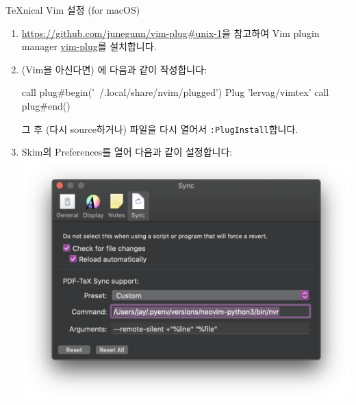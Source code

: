 \documentclass{beamer}
\begin{document}
\begin{frame}{\TeX{}nical Vim 설정 (for macOS)}
\begin{enumerate}
    \framebreak
    \item \url{https://github.com/junegunn/vim-plug#unix-1}을 참고하여 Vim plugin manager \href{https://github.com/junegunn/vim-plug}{vim-plug}를 설치합니다.
    \item (Vim을 아신다면) 에 다음과 같이 작성합니다:
      \begin{vimcode}
        call plug#begin('~/.local/share/nvim/plugged')
        Plug 'lervag/vimtex'
        call plug#end()
      \end{vimcode}
      그 후 (다시 source하거나) 파일을 다시 열어서 \verb/:PlugInstall/합니다.

    \framebreak
    \item Skim의 Preferences를 열어 다음과 같이 설정합니다:
      \centering\includegraphics[width=0.9\linewidth]{figures/skim-sync}
  \end{enumerate}
\end{frame}
\end{document}
